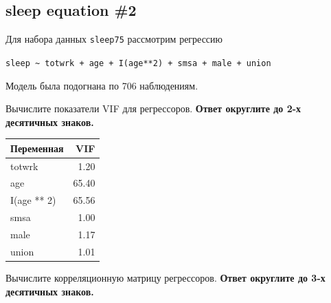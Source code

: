 \documentclass[
  russian,
]{article}
\newcounter{none} %
\begin{document}
\subsection{sleep equation \#2}\label{sleep-equation-2}

Для набора данных \texttt{sleep75} рассмотрим регрессию

\texttt{sleep\ \textasciitilde{}\ totwrk\ +\ age\ +\ I(age**2)\ +\ smsa\ +\ male\ +\ union}

Модель была подогнана по 706 наблюдениям.

Вычислите показатели VIF для регрессоров. \textbf{Ответ округлите до 2-х
десятичных знаков.}

{\def\LTcaptype{none} %
\begin{longtable}[]{@{}lr@{}}
\toprule\noalign{}
Переменная & VIF \\
\midrule\noalign{}
\endhead
\bottomrule\noalign{}
\endlastfoot
totwrk & 1.20 \\
age & 65.40 \\
I(age ** 2) & 65.56 \\
smsa & 1.00 \\
male & 1.17 \\
union & 1.01 \\
\end{longtable}
}

Вычислите корреляционную матрицу регрессоров. \textbf{Ответ округлите до
3-х десятичных знаков.}
\end{document}
